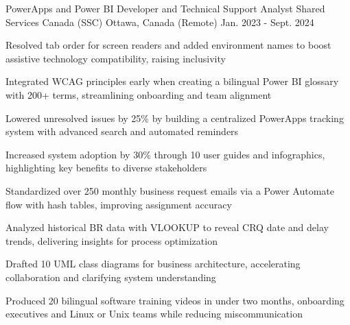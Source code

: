
\begin{cventries}

\cventry
  {PowerApps and Power BI Developer and Technical Support Analyst}
  {Shared Services Canada (SSC)}
  {Ottawa, Canada (Remote)}
  {Jan. 2023 - Sept. 2024}
  {
    \begin{cvitems}
      \item {Resolved tab order for screen readers and added environment names to boost assistive technology compatibility, raising inclusivity}
      \item {Integrated WCAG principles early when creating a bilingual Power BI glossary with 200+ terms, streamlining onboarding and team alignment}
      \item {Lowered unresolved issues by 25\% by building a centralized PowerApps tracking system with advanced search and automated reminders}
      \item {Increased system adoption by 30\% through 10 user guides and infographics, highlighting key benefits to diverse stakeholders}
      \item {Standardized over 250 monthly business request emails via a Power Automate flow with hash tables, improving assignment accuracy}
      \item {Analyzed historical BR data with VLOOKUP to reveal CRQ date and delay trends, delivering insights for process optimization}
      \item {Drafted 10 UML class diagrams for business architecture, accelerating collaboration and clarifying system understanding}
      \item {Produced 20 bilingual software training videos in under two months, onboarding executives and Linux or Unix teams while reducing miscommunication}
    \end{cvitems}
  }


\end{cventries}
